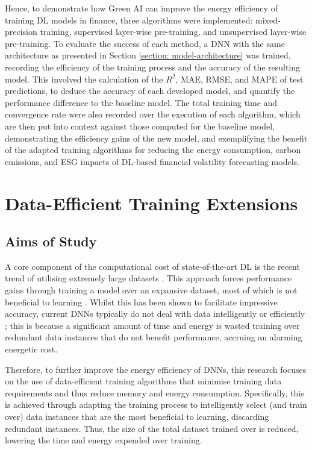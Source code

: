 \documentclass[a4paper, 11pt]{report}
\begin{document}
    Hence, to demonstrate how Green AI can improve the energy efficiency of training DL models in finance, three algorithms were implemented: mixed-precision training, supervised layer-wise pre-training, and unsupervised layer-wise pre-training. To evaluate the success of each method, a DNN with the same architecture as presented in Section \ref{section: model-architecture} was trained, recording the efficiency of the training process and the accuracy of the resulting model. This involved the calculation of the $R^2$, MAE, RMSE, and MAPE of test predictions, to deduce the accuracy of each developed model, and quantify the performance difference to the baseline model. The total training time and convergence rate were also recorded over the execution of each algorithm, which are then put into context against those computed for the baseline model, demonstrating the efficiency gains of the new model, and exemplifying the benefit of the adapted training algorithms for reducing the energy consumption, carbon emissions, and ESG impacts of DL-based financial volatility forecasting models.


    \section{Data-Efficient Training Extensions}
    \label{section: data-extensions}

    \subsection{Aims of Study}

    A core component of the computational cost of state-of-the-art DL is the recent trend of utilising extremely large datasets \citep{schwartz-2019}. This approach forces performance gains through training a model over an expansive dataset, most of which is not beneficial to learning \citep{bender-2021}. Whilst this has been shown to facilitate impressive accuracy, current DNNs typically do not deal with data intelligently or efficiently \citep{aljarrah-2015}; this is because a significant amount of time and energy is wasted training over redundant data instances that do not benefit performance, accruing an alarming energetic cost.

    Therefore, to further improve the energy efficiency of DNNs, this research focuses on the use of data-efficient training algorithms that minimise training data requirements and thus reduce memory and energy consumption. Specifically, this is achieved through adapting the training process to intelligently select (and train over) data instances that are the most beneficial to learning, discarding redundant instances. Thus, the size of the total dataset trained over is reduced, lowering the time and energy expended over training. 
\end{document}
